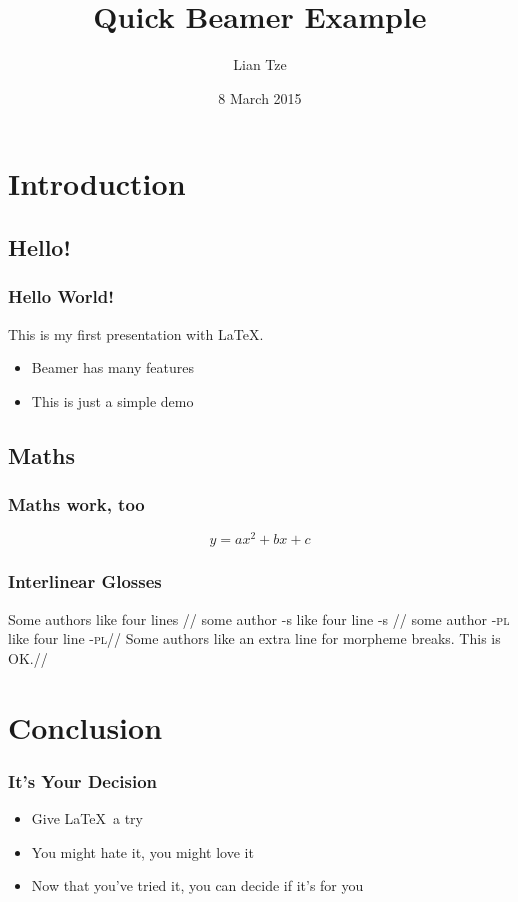 \documentclass[xcolor={svgnames,dvipsnames,x11names}]{beamer}
\author{Lian Tze}
\title{Quick Beamer Example}
\institute{KDU College, Penang}
\date{8 March 2015}
\begin{document}
\begin{frame}
\maketitle
\end{frame}

\section{Introduction}
\subsection{Hello!}

\begin{frame}
\frametitle{Hello World!}

This is my first presentation with \LaTeX.

\begin{itemize}[<+->]
\item Beamer has many features
\item This is just a simple demo
\end{itemize}
\end{frame}

\subsection{Maths}
\begin{frame}
\frametitle{Maths work, too}
\begin{equation}
y = ax^2 + bx + c
\end{equation}
\end{frame}

\begin{frame}
\frametitle{Interlinear Glosses}
\ex
\begingl
\gla Some authors like four lines //
\glb some {author -s} like four {line -s} //
\glc some {author \textsc{-pl}} like four {line \textsc{-pl}}//
\glft Some authors like an extra line for morpheme breaks. This is OK.//
\endgl
\xe
\end{frame}

\section{Conclusion}
\begin{frame}
\frametitle{It's Your Decision}
\begin{itemize}
\item Give \LaTeX\ a try
\item You might hate it, you might love it
\item Now that you've tried it, you can decide if it's for you
\end{itemize}
\end{frame}
\end{document}
